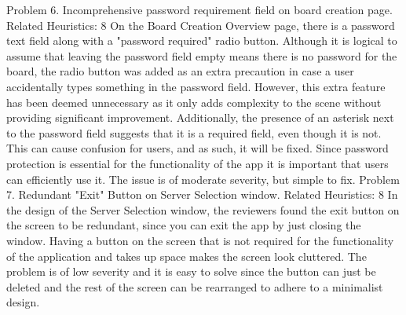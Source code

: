 Problem 6. 
\newline
Incomprehensive password requirement field on board creation page.
\newline
Related Heuristics: 8
\newline
\indent On the Board Creation Overview page, there is a password text field along with a "password required" radio button. Although it is logical to assume that leaving the password field empty means there is no password for the board, the radio button was added as an extra precaution in case a user accidentally types something in the password field. However, this extra feature has been deemed unnecessary as it only adds complexity to the scene without providing significant improvement. Additionally, the presence of an asterisk next to the password field suggests that it is a required field, even though it is not. This can cause confusion for users, and as such, it will be fixed.
\newline
\indent Since password protection is essential for the functionality of the app it is important that users can efficiently use it. The issue is of moderate severity, but simple to fix.
\newline
\newline
Problem 7.
\newline
Redundant "Exit" Button on Server Selection window.
\newline
Related Heuristics: 8
\newline
\indent In the design of the Server Selection window, the reviewers found the exit button on the screen to be redundant, since you can exit the app by just closing the window. Having a button on the screen that is not required for the functionality of the application and takes up space makes the screen look cluttered. 
\newline
\indent The problem is of low severity and it is easy to solve since the button can just be deleted and the rest of the screen can be rearranged to adhere to a minimalist design.